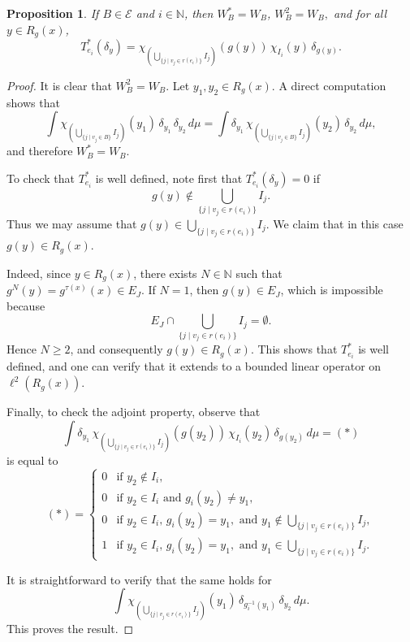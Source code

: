 \documentclass[12pt, reqno]{amsart}
\newtheorem{proposition}[theorem]{Proposition}
\theoremstyle{definition}
\theoremstyle{remark}
\numberwithin{equation}{section}
\begin{document}
\begin{proposition}
    If $B \in \mathcal{E}$ and $i \in \mathbb{N}$, then $  W_B^* = W_B$, $W_B^2 = W_B,$
    and for all $y \in R_g(x)$,
    \[
    T_{e_i}^*(\delta_y) 
       = \chi_{\left( \bigcup\limits_{\{j \mid v_j \in r(e_i)\}} I_j \right)}( g(y)) \,
         \chi_{I_i}(y)\,\delta_{g(y)}.
    \]
\end{proposition}


\begin{proof}
It is clear that $W_B^2 = W_B$. 
Let $y_1, y_2 \in R_g(x)$. 
A direct computation shows that
\[
\int \chi_{\left( \bigcup_{\{j \mid v_j \in B\}} I_j \right)}(y_1)\,
   \delta_{y_1}\,\delta_{y_2}\, d\mu
   = \int \delta_{y_1}\,
   \chi_{\left( \bigcup_{\{j \mid v_j \in B\}} I_j \right)}(y_2)\,
   \delta_{y_2}\, d\mu,
\]
and therefore $W_B^* = W_B$.  

To check that $T_{e_i}^*$ is well defined, note first that 
$T_{e_i}^*(\delta_y) = 0$ if 
\[
g(y) \notin \bigcup_{\{j \mid v_j \in r(e_i)\}} I_j.
\] 
Thus we may assume that 
$g(y) \in \bigcup_{\{j \mid v_j \in r(e_i)\}} I_j$. 
We claim that in this case $g(y) \in R_g(x)$.  

Indeed, since $y \in R_g(x)$, there exists $N \in \mathbb{N}$ such that 
$g^N(y) = g^{\tau(x)}(x) \in E_J$. 
If $N=1$, then $g(y) \in E_J$, which is impossible because
\[
E_J \cap \bigcup_{\{j \mid v_j \in r(e_i)\}} I_j = \emptyset.
\]
Hence $N \geq 2$, and consequently $g(y) \in R_g(x)$. 
This shows that $T_{e_i}^*$ is well defined, and one can verify that it extends to a bounded linear operator on $\ell^2(R_g(x))$.

Finally, to check the adjoint property, observe that
\[
\int \delta_{y_1}\,
   \chi_{\left( \bigcup_{\{j \mid v_j \in r(e_i)\}} I_j \right)}(g(y_2))\,
   \chi_{I_i}(y_2)\,
   \delta_{g(y_2)}\, d\mu = (*)
\] is equal to \[ (*)=
\begin{cases}
   0 & \text{if } y_2 \notin I_i, \\[4pt]
   0 & \text{if } y_2 \in I_i \text{ and } g_i(y_2) \neq y_1, \\[4pt]
   0 & \text{if } y_2 \in I_i,\, g_i(y_2) = y_1, 
       \text{ and } y_1 \notin \bigcup_{\{j \mid v_j \in r(e_i)\}} I_j, \\[4pt]
   1 & \text{if } y_2 \in I_i,\, g_i(y_2) = y_1, 
       \text{ and } y_1 \in \bigcup_{\{j \mid v_j \in r(e_i)\}} I_j.
\end{cases}
\]

It is straightforward to verify that the same holds for
\[
\int \chi_{\left( \bigcup_{\{j \mid v_j \in r(e_i)\}} I_j \right)}(y_1)\,
   \delta_{g_i^{-1}(y_1)}\,\delta_{y_2}\, d\mu.
\]
This proves the result.
\end{proof}
\end{document}
